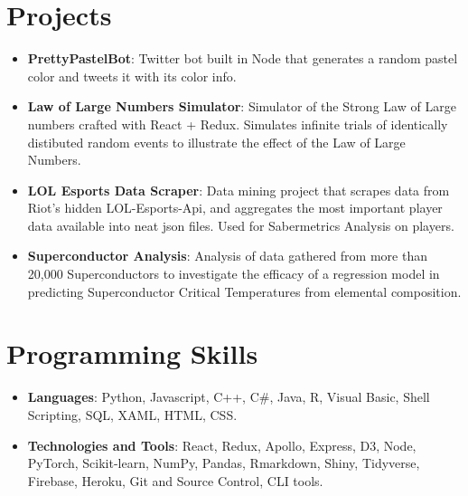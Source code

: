\documentclass[letterpaper,11pt]{article}
\newcommand{\resumeItem}[2]{
  \item\small{
    \textbf{#1}{: #2 \vspace{-2pt}}
  }
}
\newcommand{\resumeSubItem}[2]{\resumeItem{#1}{#2}\vspace{-4pt}}
\newcommand{\resumeSubHeadingListStart}{\begin{itemize}[leftmargin=*]}
\newcommand{\resumeSubHeadingListEnd}{\end{itemize}}
\begin{document}
\section{Projects}
  \resumeSubHeadingListStart
    \resumeSubItem{PrettyPastelBot}
      {Twitter bot built in Node that generates a random pastel color and tweets it with its color info.}
    \resumeSubItem{Law of Large Numbers Simulator}
      {Simulator of the Strong Law of Large numbers crafted with React + Redux. Simulates infinite trials of identically distibuted random events to illustrate the effect of the Law of Large Numbers.}
    \resumeSubItem{LOL Esports Data Scraper}
      {Data mining project that scrapes data from Riot’s hidden LOL-Esports-Api, and aggregates the most important player data available into neat json files. Used for Sabermetrics Analysis on players.}
    \resumeSubItem{Superconductor Analysis}
      {Analysis of data gathered from more than 20,000 Superconductors to investigate the efficacy of a regression model in predicting Superconductor Critical Temperatures from elemental composition.}
  \resumeSubHeadingListEnd


\section{Programming Skills}
 \resumeSubHeadingListStart
   \resumeSubItem{Languages}
    {Python, Javascript, C++, C\#, Java, R, Visual Basic, Shell Scripting, SQL, XAML, HTML, CSS.}
  \resumeSubItem{Technologies and Tools}
    {React, Redux, Apollo, Express, D3, Node, PyTorch, Scikit-learn, NumPy, Pandas, Rmarkdown, Shiny, Tidyverse, Firebase, Heroku, Git and Source Control, CLI tools.}
 \resumeSubHeadingListEnd

\end{document}

